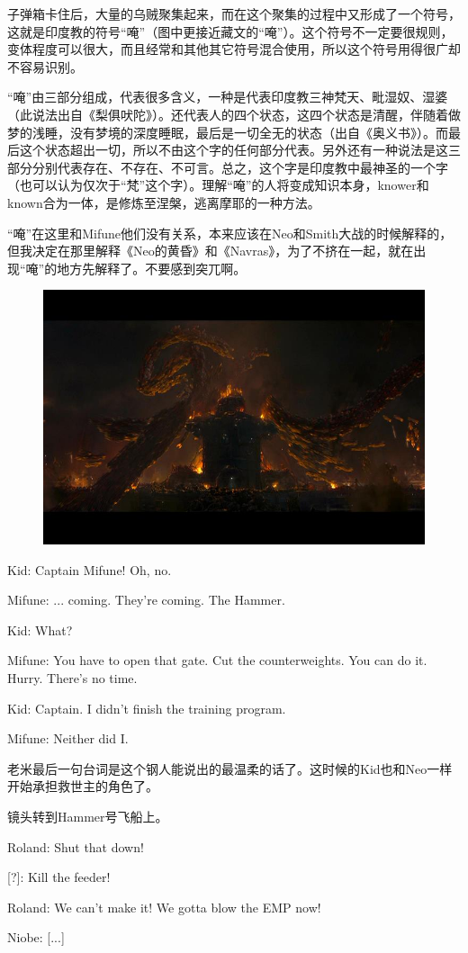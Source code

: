 \documentclass[UTF8]{ctexart}
\newenvironment{myquote}{\color{green} \setlength{\leftskip}{6em} \setlength{\rightskip}{4em} \setlength{\parindent}{-2em}}{\par}
\begin{document}
子弹箱卡住后，大量的乌贼聚集起来，而在这个聚集的过程中又形成了一个符号，这就是印度教的符号“唵”（图中更接近藏文的“唵”）。这个符号不一定要很规则，变体程度可以很大，而且经常和其他其它符号混合使用，所以这个符号用得很广却不容易识别。

“唵”由三部分组成，代表很多含义，一种是代表印度教三神梵天、毗湿奴、湿婆（此说法出自《梨俱吠陀》）。还代表人的四个状态，这四个状态是清醒，伴随着做梦的浅睡，没有梦境的深度睡眠，最后是一切全无的状态（出自《奥义书》）。而最后这个状态超出一切，所以不由这个字的任何部分代表。另外还有一种说法是这三部分分别代表存在、不存在、不可言。总之，这个字是印度教中最神圣的一个字（也可以认为仅次于“梵”这个字）。理解“唵”的人将变成知识本身，knower和known合为一体，是修炼至涅槃，逃离摩耶的一种方法。

“唵”在这里和Mifune他们没有关系，本来应该在Neo和Smith大战的时候解释的，但我决定在那里解释《Neo的黄昏》和《Navras》，为了不挤在一起，就在出现“唵”的地方先解释了。不要感到突兀啊。

\begin{figure}[htb]
\centering
\includegraphics[width=0.5\linewidth]{fig/cc8c3c6dbb3e09fb4216944d.jpg}
\end{figure}

\begin{myquote}
Kid: Captain Mifune! Oh, no.

Mifune: ... coming. They're coming. The Hammer.

Kid: What?

Mifune: You have to open that gate. Cut the counterweights. You can do it. Hurry. There's no time.

Kid: Captain. I didn't finish the training program.

Mifune: Neither did I.
\end{myquote}

老米最后一句台词是这个钢人能说出的最温柔的话了。这时候的Kid也和Neo一样开始承担救世主的角色了。

镜头转到Hammer号飞船上。

\begin{myquote}
Roland: Shut that down!

[?]: Kill the feeder!

Roland: We can't make it! We gotta blow the EMP now!

Niobe: [...]
\end{myquote}
\end{document}
